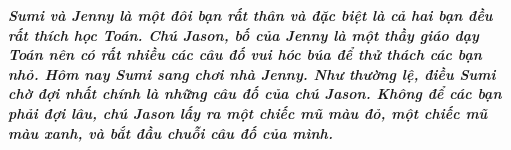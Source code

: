 \centering
\endgroup
\vspace*{150pt}

	\textbf{\textit{Sumi và Jenny là một đôi bạn rất  thân và đặc biệt là cả hai bạn đều rất thích học  Toán. Chú Jason, bố của Jenny là một thầy giáo dạy Toán nên có rất nhiều các câu đố vui hóc búa để thử thách các  bạn nhỏ. 
	\vskip 0.2cm
	Hôm nay Sumi sang chơi nhà Jenny. Như thường lệ, điều Sumi chờ đợi nhất chính là những câu đố của chú Jason.
	\vskip 0.2cm
	Không để các bạn phải đợi lâu, chú Jason lấy ra một chiếc mũ màu đỏ, một chiếc mũ màu xanh, và bắt đầu chuỗi câu đố của mình.}}	

